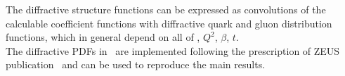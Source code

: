 The diffractive structure functions can be expressed as convolutions of the
calculable coefficient functions with diffractive quark and gluon distribution functions,
 which in general depend on all of \xpom, $Q^2$, $\beta$, $t$.
\\
The diffractive PDFs in \fitter\ are implemented following the prescription of ZEUS
publication~\cite{zeus:diff2009} and can be used to reproduce the main results.
%
